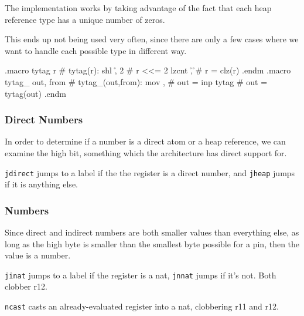 The implementation works by taking advantage of the fact that each heap
reference type has a unique number of zeros.

This ends up not being used very often, since there are only a few cases
where we want to handle each possible type in different way.

\begin{asm}
.macro tytag r                            # tytag(r):
	shl	\r, 2                     #   r <<= 2
	lzcnt	\r, \r                    #   r = clz(r)
.endm
.macro tytag_ out, from                   # tytag_(out,from):
	mov	\out, \from               #   out = inp
	tytag	\out                      #   out = tytag(out)
.endm
\end{asm}

\subsubsection{Direct Numbers}

In order to determine if a number is a direct atom or a heap reference,
we can examine the high bit, something which the architecture has direct
support for.

\lstinline|jdirect| jumps to a label if the the register is a direct
number, and \lstinline|jheap| jumps if it is anything else.


\subsubsection{Numbers}

Since direct and indirect numbers are both smaller values than everything
else, as long as the high byte is smaller than the smallest byte possible
for a pin, then the value is a number.

\lstinline|jinat| jumps to a label if the register is a nat,
\lstinline|jnnat| jumps if it's not.  Both clobber r12.

\lstinline|ncast| casts an already-evaluated register into a nat, clobbering
r11 and r12.

